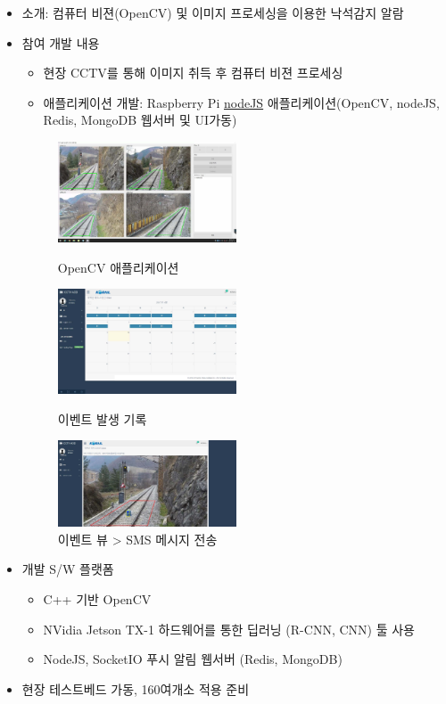 \documentclass[10pt,a4paper,ragged2e]{altacv}
\begin{document}
\begin{fullwidth}
\begin{itemize}
\item
  소개: 컴퓨터 비젼(OpenCV) 및 이미지 프로세싱을 이용한 낙석감지 알람
\item 참여 개발 내용
  \begin{itemize}
    \item 현장 CCTV를 통해 이미지 취득 후 컴퓨터 비젼 프로세싱
    \item 애플리케이션 개발: Raspberry Pi \href{https://nodejs.org}{nodeJS} 애플리케이션(OpenCV, nodeJS, Redis, MongoDB 웹서버 및 UI가동)
  \end{itemize}
  \begin{figure}[!ht]
    \begin{fullwidth}
      \parbox{0.5\textwidth}{
      \centering
      \includegraphics[width=0.5\textwidth]{images/korail_aod_01.jpg}
      \caption*{OpenCV 애플리케이션}
      }\qquad
      \parbox{0.5\textwidth}{
      \centering
      \includegraphics[width=0.5\textwidth]{images/korail_aod_02.jpg}
      \caption*{이벤트 발생 기록}
      }\qquad
      \parbox{0.5\textwidth}{
      \centering
      \includegraphics[width=0.5\textwidth]{images/korail_aod_03_01.png}
      \caption*{이벤트 뷰 > SMS 메시지 전송}
      }
    \end{fullwidth}
  \end{figure}

\item 개발 S/W 플랫폼
  \begin{itemize}
    \item C++ 기반 OpenCV
    \item NVidia Jetson TX-1 하드웨어를 통한 딥러닝 (R-CNN, CNN) 툴 사용
    \item NodeJS, SocketIO 푸시 알림 웹서버 (Redis, MongoDB)
  \end{itemize}
\item 현장 테스트베드 가동, 160여개소 적용 준비
\end{itemize}


\end{fullwidth}
\end{document}
